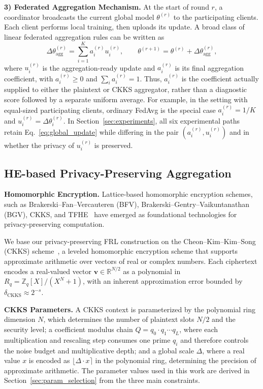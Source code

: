 \documentclass[journal]{IEEEtran}
\begin{document}
\textbf{3) Federated Aggregation Mechanism.}
At the start of round $r$, a coordinator broadcasts the current global model
$\theta^{(r)}$ to the participating clients.
Each client performs local training, then uploads its
update. A broad class of linear federated aggregation rules can be written as
\begin{equation}\label{eq:global_update}
\Delta\theta_{\mathrm{agg}}^{(r)}
=\sum_{i=1}^{K}a_i^{(r)}u_i^{(r)},
\qquad
\theta^{(r+1)}=\theta^{(r)}+\Delta\theta_{\mathrm{agg}}^{(r)},
\end{equation}
where $u_i^{(r)}$ is the aggregation-ready update and $a_i^{(r)}$ is its
final aggregation coefficient, with $a_i^{(r)}\geq 0$ and
$\sum_i a_i^{(r)}=1$. Thus, $a_i^{(r)}$ is the coefficient actually supplied
to either the plaintext or CKKS aggregator, rather than a diagnostic score
followed by a separate uniform average. For example, in the setting with
equal-sized participating clients, ordinary FedAvg is the special case
$a_i^{(r)}=1/K$ and $u_i^{(r)}=\Delta\theta_i^{(r)}$.
In Section~\ref{sec:experiments}, all six experimental paths retain
Eq.~\eqref{eq:global_update} while differing in the pair
$(a_i^{(r)},u_i^{(r)})$ and in whether the privacy of $u_i^{(r)}$ is preserved.

\subsection{HE-based Privacy-Preserving Aggregation}

\textbf{Homomorphic Encryption.}
Lattice-based homomorphic encryption schemes, such as Brakerski--Fan--Vercauteren (BFV),
Brakerski--Gentry--Vaikuntanathan (BGV), CKKS, and
TFHE~\cite{cryptoeprint:2012/144,cryptoeprint:2011/277,cheon2017ckks,cryptoeprint:2018/421}
have emerged as foundational technologies for privacy-preserving computation.

We base our privacy-preserving FRL construction on the Cheon--Kim--Kim--Song (CKKS)
scheme~\cite{cheon2017ckks}, a leveled homomorphic encryption scheme that supports
approximate arithmetic over vectors of real or complex numbers.
Each ciphertext encodes a real-valued vector $\mathbf{v} \in \mathbb{R}^{N/2}$
as a polynomial in $R_q = \mathbb{Z}_q[X]/(X^N+1)$, with an inherent approximation
error bounded by $\delta_{\mathrm{CKKS}} \approx 2^{-s}$.

\textbf{CKKS Parameters.}
A CKKS context is parameterized by the polynomial ring dimension $N$, which
determines the number of plaintext slots $N/2$ and the security level; a
coefficient modulus chain $Q = q_0 \cdot q_1 \cdots q_L$, where each
multiplication and rescaling step consumes one prime $q_i$ and therefore
controls the noise budget and multiplicative depth; and a global scale
$\Delta$, where a real value $x$ is encoded as
$\lfloor \Delta \cdot x \rceil$ in the polynomial ring, determining the
precision of approximate arithmetic.
The parameter values used in this work are derived in
Section~\ref{sec:param_selection} from the three main constraints.
\end{document}
